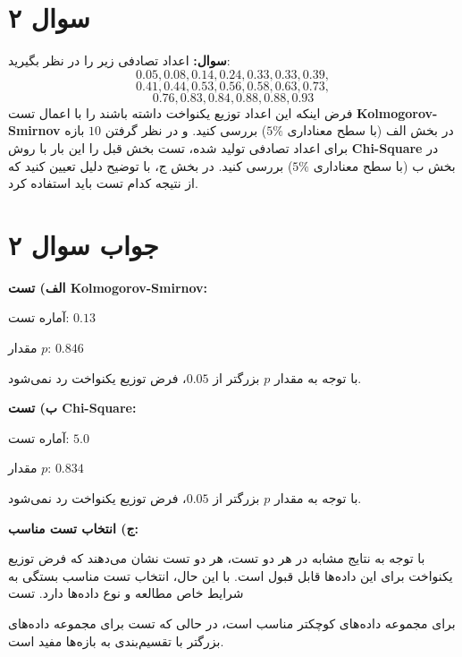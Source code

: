 \section*{سوال ۲}

\textbf{سوال:} اعداد تصادفی زیر را در نظر بگیرید:
$$
0.05, 0.08, 0.14, 0.24, 0.33, 0.33, 0.39,
$$
$$
0.41, 0.44, 0.53, 0.56, 0.58, 0.63, 0.73,
$$
$$
 0.76, 0.83, 0.84, 0.88, 0.88, 0.93
$$
فرض اینکه این اعداد توزیع یکنواخت داشته باشند را با اعمال تست \textbf{Kolmogorov-Smirnov} در بخش الف (با سطح معناداری \(5\%\)) بررسی کنید.
و در نظر گرفتن \(10\) بازه برای اعداد تصادفی تولید شده، تست بخش قبل را این بار با روش \textbf{Chi-Square} در بخش ب (با سطح معناداری \(5\%\)) بررسی کنید.
در بخش ج، با توضیح دلیل تعیین کنید که از نتیجه کدام تست باید استفاده کرد.

\section*{جواب سوال ۲}

\textbf{الف) تست Kolmogorov-Smirnov:}

آماره تست: \(0.13\)

مقدار \(p\): \(0.846\)

با توجه به مقدار \(p\) بزرگتر از \(0.05\)، فرض توزیع یکنواخت رد نمی‌شود.

\textbf{ب) تست Chi-Square:}

آماره تست: \(5.0\)

مقدار \(p\): \(0.834\)

با توجه به مقدار \(p\) بزرگتر از \(0.05\)، فرض توزیع یکنواخت رد نمی‌شود.

\textbf{ج) انتخاب تست مناسب:}

با توجه به نتایج مشابه در هر دو تست، هر دو تست نشان می‌دهند که فرض توزیع یکنواخت برای این داده‌ها قابل قبول است. با این حال، انتخاب تست مناسب بستگی به شرایط خاص مطالعه و نوع داده‌ها دارد. تست

برای مجموعه داده‌های کوچکتر مناسب است، در حالی که تست
برای مجموعه داده‌های بزرگتر با تقسیم‌بندی به بازه‌ها مفید است.